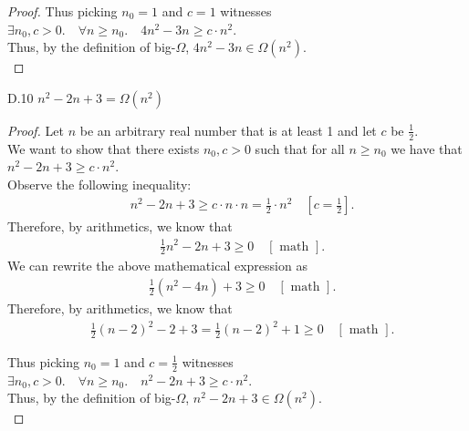 \documentclass[10pt]{article}
\begin{document}
\begin{enumerate}[label={}]
\begin{proof}
                  Thus picking $n_0=1$ and $c=1$ witnesses \\$\exists n_0, c>0 .\quad \forall n \geq n_0 .\quad 4 n^2-3 n \geq c \cdot n^2$.\\
                        Thus, by the definition of big-$\Omega$, $4 n^2-3 n \in \Omega\left(n^2\right)$.\\
            \end{proof}
            D.10 $n^2-2 n+3=\Omega\left(n^2\right)$
            \begin{proof}
                  Let $n$ be an arbitrary real number that is at least 1 and let $c$ be $\frac{1}{2}$.\\
                  We want to show that there exists $n_0, c > 0$ such that for all $n\geq n_0$ we have that $n^2-2 n+3 \geq c \cdot n^2$.\\
                  Observe the following inequality:\\
                  $$
                        \begin{aligned}
                               & n^2-2 n+3 \geq c \cdot n \cdot n =\frac{1}{2} \cdot n^2 \quad\left[c=\frac{1}{2}\right].
                        \end{aligned}
                  $$
                  Therefore, by arithmetics, we know that
                  $$
                        \begin{aligned}
                               & \frac{1}{2} n^2-2 n+3 \geq 0 \quad[\text { math }].
                        \end{aligned}
                  $$
                  We can rewrite the above mathematical expression as
                  $$
                        \begin{aligned}
                               & \frac{1}{2}\left(n^2-4 n\right)+3 \geq 0 \quad[\text { math }].
                        \end{aligned}
                  $$
                  Therefore, by arithmetics, we know that
                  $$
                        \begin{aligned}
                               & \frac{1}{2}(n-2)^2-2+3=\frac{1}{2}(n-2)^2+1 \geq 0 \quad[\text { math }].
                        \end{aligned}
                  $$

                  Thus picking $n_0=1$ and $c=\frac{1}{2}$ witnesses \\$\exists n_0, c>0 .\quad \forall n \geq n_0 .\quad n^2-2 n+3 \geq c \cdot n^2$.\\
                        Thus, by the definition of big-$\Omega$, $n^2-2 n+3 \in \Omega\left(n^2\right)$.\\
            \end{proof}
            \newpage


\end{enumerate}
\end{document}
